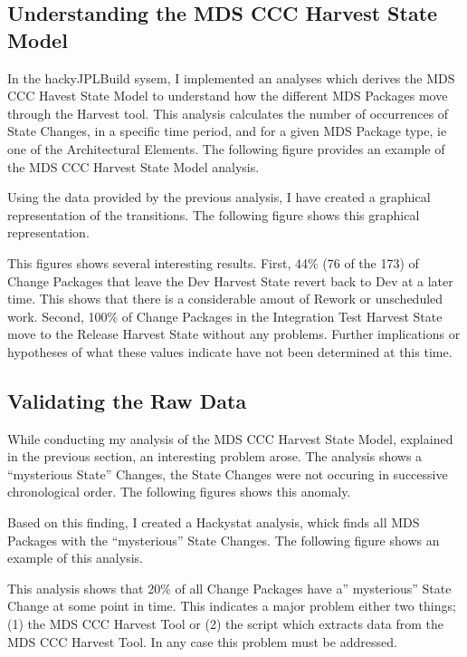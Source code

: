 \subsection{Understanding the MDS CCC Harvest State Model}
In the hackyJPLBuild sysem, I implemented an analyses which derives the MDS 
CCC Havest State Model to understand how the different MDS Packages move
through the Harvest tool.  This analysis calculates the number of
occurrences of State Changes, in a specific time period, and for a given
MDS Package type, ie one of the Architectural Elements.  The following
figure provides an example of the MDS CCC Harvest State Model analysis.


Using the data provided by the previous analysis, I have created a
graphical representation of the transitions.  The following figure shows
this graphical representation.


This figures shows several interesting results.  First, 44\% (76 of the
173) of Change Packages that leave the Dev Harvest State revert back to Dev 
at a later time.  This shows that there is a considerable amout of Rework
or unscheduled work.  Second, 100\% of Change Packages in the Integration
Test Harvest State move to the Release Harvest State without any problems.
Further implications or hypotheses of what these values indicate have not
been determined at this time.


\subsection{Validating the Raw Data}
While conducting my analysis of the MDS CCC Harvest State Model, explained
in the previous section, an interesting problem arose.  The analysis shows
a ``mysterious State'' Changes,  the State Changes were not occuring in
successive chronological order. The following figures shows this anomaly.


Based on this finding, I created a Hackystat analysis, whick finds all MDS
Packages with the ``mysterious'' State Changes.  The following figure shows 
an example of this analysis.


This analysis shows that 20\% of all Change Packages have a'' mysterious''
State Change at some point in time.  This indicates a major problem either
two things; (1) the MDS CCC Harvest Tool or (2) the script which extracts
data from the MDS CCC Harvest Tool.  In any case this problem must be
addressed.


